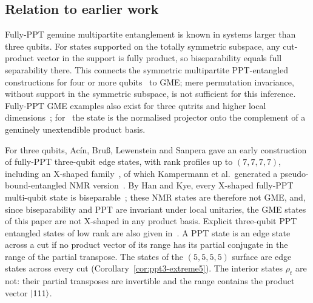 \subsection{Relation to earlier work}\label{sec:ppt3-prior}

Fully-PPT genuine multipartite entanglement is known in systems larger than three qubits. For states supported on the totally
symmetric subspace, any cut-product vector in the support
is fully product, so biseparability equals full separability
there. This connects the symmetric multipartite PPT-entangled
constructions for four or more qubits~\cite{TG,TAHKSL,ATSL} to GME;
mere permutation invariance, without support in
the symmetric subspace, is not sufficient for this inference.
Fully-PPT GME examples also exist for three qutrits
and higher local dimensions~\cite{HS,PM,SB,SBZL}; for~\cite{SBZL} the state is the normalised projector onto the
complement of a genuinely unextendible product basis.

For three qubits, Ac\'in, Bru\ss, Lewenstein and Sanpera gave an early construction of fully-PPT three-qubit edge states, with rank
profiles up to $(7,7,7,7)$, including an X-shaped family~\cite{ABLS}, of which Kampermann et al.\ generated a pseudo-bound-entangled NMR version~\cite{KPBS}.
By Han and Kye, every X-shaped fully-PPT multi-qubit state is biseparable~\cite[Cor.~5.4]{HanK}; these NMR
states are therefore not GME, and, since biseparability and PPT are invariant under local unitaries, the GME states of this
paper are not X-shaped in any product basis. Explicit three-qubit PPT entangled states of low rank are also given
in~\cite{HaKye15}.
A PPT state is an edge state across a cut if no product vector of its range has its partial conjugate in the range of the partial
transpose. The states of the $(5,5,5,5)$ surface are edge states across every cut (Corollary~\ref{cor:ppt3-extreme5}). The interior states $\rho_t$ are not: their partial transposes are invertible
and the range contains the product vector $\lvert111\rangle$.

